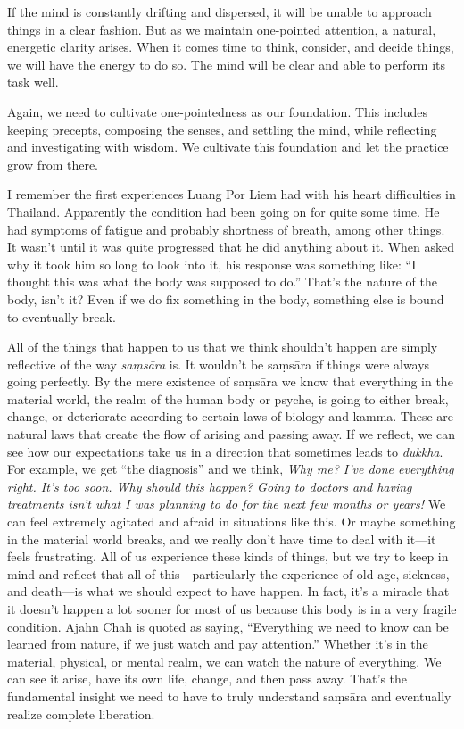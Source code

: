 If the mind is constantly drifting and dispersed, it will be unable to 
approach things in a clear fashion. But as we maintain one-pointed 
attention, a natural, energetic clarity arises. When it comes time to 
think, consider, and decide things, we will have the energy to do so. 
The mind will be clear and able to perform its task well.

Again, we need to cultivate one-pointedness as our foundation. This 
includes keeping precepts, composing the senses, and settling the mind, 
while reflecting and investigating with wisdom. We cultivate this 
foundation and let the practice grow from there.


I remember the first experiences Luang Por Liem had with his heart 
difficulties in Thailand. Apparently the condition had been going on 
for quite some time. He had symptoms of fatigue and probably shortness 
of breath, among other things. It wasn't until it was quite progressed 
that he did anything about it. When asked why it took him so long to 
look into it, his response was something like: ``I thought this was 
what the body was supposed to do.'' That's the nature of the body, 
isn't it? Even if we do fix something in the body, something else is 
bound to eventually break.

All of the things that happen to us that we think shouldn't happen are 
simply reflective of the way \emph{saṃsāra} is. It wouldn't be 
saṃsāra if things were always going perfectly. By the mere existence 
of saṃsāra we know that everything in the material world, the realm 
of the human body or psyche, is going to either break, change, or 
deteriorate according to certain laws of biology and kamma. These are 
natural laws that create the flow of arising and passing away. If we 
reflect, we can see how our expectations take us in a direction that 
sometimes leads to \emph{dukkha}. For example, we get ``the diagnosis'' 
and we think, \emph{Why me? I've done everything right. It's too soon. 
Why should this happen? Going to doctors and having treatments isn't 
what I was planning to do for the next few months or years!} We can 
feel extremely agitated and afraid in situations like this. Or maybe 
something in the material world breaks, and we really don't have time 
to deal with it---it feels frustrating. All of us experience these 
kinds of things, but we try to keep in mind and reflect that all of 
this---particularly the experience of old age, sickness, and death---is 
what we should expect to have happen. In fact, it's a miracle that it 
doesn't happen a lot sooner for most of us because this body is in a 
very fragile condition. Ajahn Chah is quoted as saying, ``Everything we 
need to know can be learned from nature, if we just watch and pay 
attention.'' Whether it's in the material, physical, or mental realm, 
we can watch the nature of everything. We can see it arise, have its 
own life, change, and then pass away. That's the fundamental insight we 
need to have to truly understand saṃsāra and eventually realize 
complete liberation.

